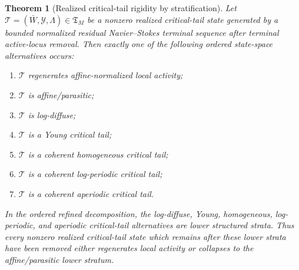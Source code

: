 \documentclass[11pt]{amsart}
\numberwithin{equation}{section}
\theoremstyle{plain}
\newtheorem{theorem}{Theorem}[section]
\theoremstyle{definition}
\theoremstyle{remark}
\newcommand{\Tcrit}{\mathfrak T_M}
\begin{document}
\begin{theorem}[Realized critical-tail rigidity by stratification]
\label{thm:realized-critical-tail-rigidity}
Let \(\mathcal T=(\bar W,\mathcal Y,\Lambda)\in\Tcrit\) be a nonzero realized
critical-tail state generated by a bounded normalized residual Navier--Stokes
terminal sequence after terminal active-locus removal.  Then exactly one of the
following ordered state-space alternatives occurs:
\begin{enumerate}[label=\textup{(\alph*)}]
   \item \(\mathcal T\) regenerates affine-normalized local activity;
   \item \(\mathcal T\) is affine/parasitic;
   \item \(\mathcal T\) is log-diffuse;
   \item \(\mathcal T\) is a Young critical tail;
   \item \(\mathcal T\) is a coherent homogeneous critical tail;
   \item \(\mathcal T\) is a coherent log-periodic critical tail;
   \item \(\mathcal T\) is a coherent aperiodic critical tail.
\end{enumerate}
In the ordered refined decomposition, the log-diffuse, Young, homogeneous,
log-periodic, and aperiodic critical-tail alternatives are lower structured strata.
Thus every nonzero realized critical-tail state which remains after these
lower strata have been removed either regenerates local activity or collapses
to the affine/parasitic lower stratum.
\end{theorem}
\end{document}
